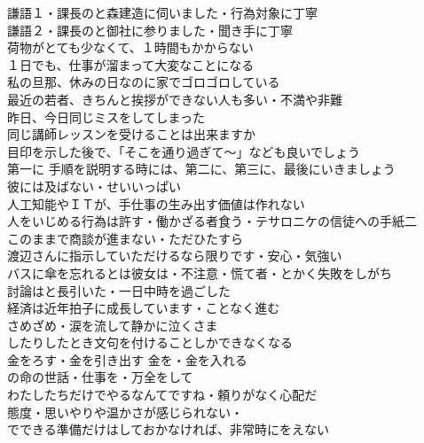 謙語１・課長のと森建造に伺いました・行為対象に丁寧\\
謙語２・課長のと御社に参りました・聞き手に丁寧\\

荷物がとても少なくて、１時間もかからない\\
１日でも、仕事が溜まって大変なことになる\\
私の旦那、休みの日なのに家でゴロゴロしている\\
最近の若者、きちんと挨拶ができない人も多い・不満や非難\\

昨日、今日同じミスをしてしまった\\
同じ講師レッスンを受けることは出来ますか\\
目印を示した後で、「そこを通り過ぎて～」なども良いでしょう\\
第一に \santen 手順を説明する時には、第二に、第三に、最後にいきましょう\\

彼には及ばない・せいいっぱい\\
人工知能やＩＴが、手仕事の生み出す価値は作れない\\
人をいじめる行為は許す・働かざる者食う・テサロニケの信徒への手紙二\\

このままで商談が進まない・ただひたすら\\
渡辺さんに指示していただけるなら限りです・安心・気強い\\
バスに傘を忘れるとは彼女は・不注意・慌て者・とかく失敗をしがち\\

討論はと長引いた・一日中時を過ごした\\
経済は近年拍子に成長しています・ことなく進む\\

さめざめ・涙を流して静かに泣くさま\\
したりしたとき文句を付けることしかできなくなる\\
金をろす・金を引き出す \opp 金を・金を入れる\\
の命の世話・仕事を・万全をして\\
わたしたちだけでやるなんてですね・頼りがなく心配だ\\
態度・思いやりや温かさが感じられない・\\
でできる準備だけはしておかなければ、非常時にをえない\\

